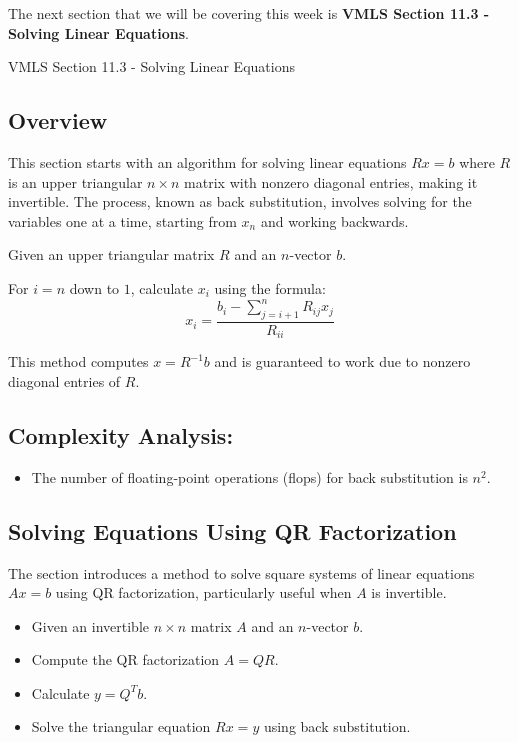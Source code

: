 The next section that we will be covering this week is \textbf{VMLS Section 11.3 - Solving Linear Equations}. 

\begin{notes}{VMLS Section 11.3 - Solving Linear Equations}
    \subsection*{Overview}

    This section starts with an algorithm for solving linear equations $Rx = b$ where $R$ is an upper triangular $n \times n$ matrix with nonzero diagonal entries, making it invertible. The process, 
    known as back substitution, involves solving for the variables one at a time, starting from $x_n$ and working backwards. \vspace*{1em}

    \begin{Highlight}
        \item Given an upper triangular matrix $R$ and an $n$-vector $b$.
        \item For $i = n$ down to $1$, calculate $x_i$ using the formula:
        \begin{equation*}
            x_i = \frac{b_i - \sum_{j=i+1}^{n} R_{ij}x_j}{R_{ii}}
        \end{equation*}
        \item This method computes $x = R^{-1}b$ and is guaranteed to work due to nonzero diagonal entries of $R$.
    \end{Highlight}

    \subsection*{Complexity Analysis:}
    \begin{itemize}
        \item The number of floating-point operations (flops) for back substitution is $n^2$.
    \end{itemize}

    \subsection*{Solving Equations Using QR Factorization}
    The section introduces a method to solve square systems of linear equations $Ax = b$ using QR factorization, particularly useful when $A$ is invertible.

    \begin{Highlight}
        \begin{itemize}
            \item Given an invertible $n \times n$ matrix $A$ and an $n$-vector $b$.
            \item Compute the QR factorization $A = QR$.
            \item Calculate $y = Q^Tb$.
            \item Solve the triangular equation $Rx = y$ using back substitution.
        \end{itemize}
    \end{Highlight}


\end{notes}
